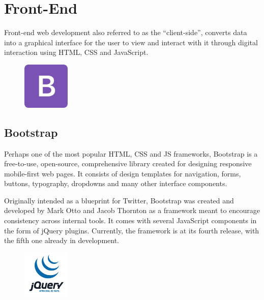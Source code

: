 \documentclass{report}
\begin{document}
\section {Front-End}
Front-end web development also referred to as the “client-side”, converts data into a graphical interface for the user to view and interact with it through digital interaction using HTML, CSS and JavaScript.

\begin{figure}
	\vspace*{-1.5cm}
    \centering
    \includegraphics[width=0.2\textwidth]{bootstrap}
	\vspace{-10pt} 
\end{figure}

\subsection {Bootstrap}
Perhaps one of the most popular HTML, CSS and JS frameworks, Bootstrap is a free-to-use, open-source, comprehensive library created for designing responsive mobile-first web pages. It consists of design templates for navigation, forms, buttons, typography, dropdowns and many other interface components. \par

Originally intended as a blueprint for Twitter, Bootstrap was created and developed by Mark Otto and Jacob Thornton as a framework meant to encourage consistency across internal tools. It comes with several JavaScript components in the form of jQuery plugins. Currently, the framework is at its fourth release, with the fifth one already in development.

\begin{figure}
	\vspace*{-1.5cm}
    \centering
    \includegraphics[width=0.2\textwidth]{jquery}
	\vspace{-10pt} 
\end{figure}
\end{document}
